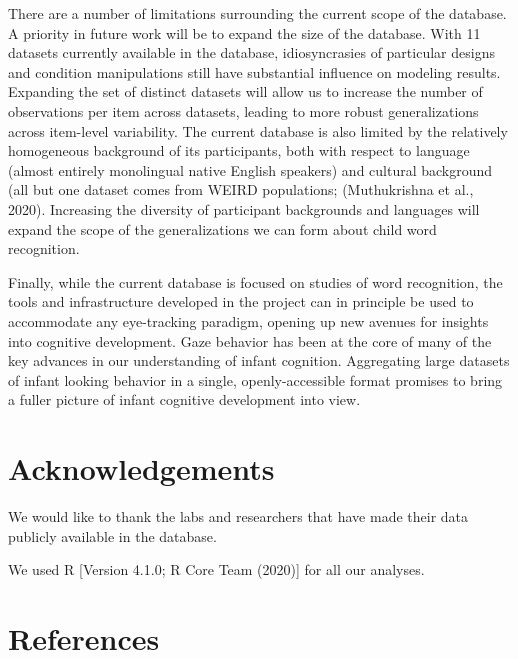 \documentclass[
  english,
  man,floatsintext]{apa6}
\begin{document}
There are a number of limitations surrounding the current scope of the database.
A priority in future work will be to expand the size of the database.
With 11 datasets currently available in the database, idiosyncrasies of particular designs and condition manipulations still have substantial influence on modeling results.
Expanding the set of distinct datasets will allow us to increase the number of observations per item across datasets, leading to more robust generalizations across item-level variability.
The current database is also limited by the relatively homogeneous background of its participants, both with respect to language (almost entirely monolingual native English speakers) and cultural background (all but one dataset comes from WEIRD populations; (Muthukrishna et al., 2020).
Increasing the diversity of participant backgrounds and languages will expand the scope of the generalizations we can form about child word recognition.

Finally, while the current database is focused on studies of word recognition, the tools and infrastructure developed in the project can in principle be used to accommodate any eye-tracking paradigm, opening up new avenues for insights into cognitive development.
Gaze behavior has been at the core of many of the key advances in our understanding of infant cognition.
Aggregating large datasets of infant looking behavior in a single, openly-accessible format promises to bring a fuller picture of infant cognitive development into view.

\hypertarget{acknowledgements}{%
\section{Acknowledgements}\label{acknowledgements}}

We would like to thank the labs and researchers that have made their data publicly available in the database.

We used R {[}Version 4.1.0; R Core Team (2020){]} for all our analyses.

\newpage

\hypertarget{references}{%
\section{References}\label{references}}

\begingroup
\setlength{\parindent}{-0.5in}
\setlength{\leftskip}{0.5in}
\end{document}
